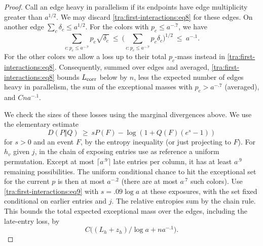 \begin{proof}
\label{tra:first-interactions:parallelism-and-heavy-atom-losses}
Call an edge heavy in parallelism if its endpoints have edge multiplicity greater than \(a^{1/2}\). We may discard \eqref{tra:first-interactions:eq8} for these edges. On another edge \(\sum_c\delta_c\le a^{1/2}\). For the colors with \(p_c\le a^{-.7}\), we have
\[
             \sum_{c:p_c\le a^{-.7}} p_c\sqrt{\delta_c}
                  \ \le\ \Big(\sum_{c:p_c\le a^{-.7}} p_c\delta_c\Big)^{1/2}
                  \ \le\ a^{-.1}.
\]
For the other colors we allow a loss up to their total \(p_c\)-mass instead in \eqref{tra:first-interactions:eq8}. Consequently, summed over edges and averaged, \eqref{tra:first-interactions:eq8} bounds \(L_{\rm corr}\) below by \(n\), less the expected number of edges heavy in parallelism, the sum of the exceptional masses with \(p_c>a^{-.7}\) (averaged), and \(C n a^{-.1}\).

We check the sizes of these losses using the marginal divergences above. We use the elementary estimate
\begin{equation}
                D(P\Vert Q)\ \ge\ s P(F)-\log(1+Q(F)(e^s-1))\label{tra:first-interactions:eq9}
\end{equation}
for \(s>0\) and an event \(F\), by the entropy inequality (or just projecting to \(F\)). For \(h_v\) given \(j\), in the chain of exposing entries use as reference a uniform permutation. Except at most \(\lceil a^{.9}\rceil\) late entries per column, it has at least \(a^{.9}\) remaining possibilities. The uniform conditional chance to hit the exceptional set for the current \(p\) is then at most \(a^{-.2}\) (there are at most \(a^{.7}\) such colors). Use \eqref{tra:first-interactions:eq9} with \(s=.09\log a\) at these exposures, with the set fixed conditional on earlier entries and \(j\). The relative entropies sum by the chain rule. This bounds the total expected exceptional mass over the edges, including the late-entry loss, by
\begin{equation}
                     C\big((L_h+z_h)/\log a+n a^{-.1}\big).\label{tra:first-interactions:eq10}
\end{equation}


\end{proof}
